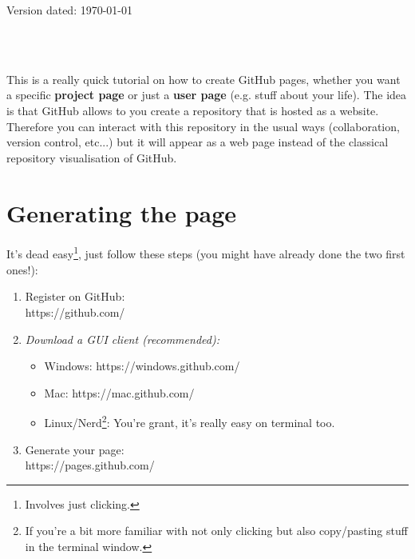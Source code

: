 \documentclass[a4paper,11pt]{article}
\begin{document}
\begin{flushright}
Version dated: \today
\end{flushright}
\begin{center}

\\
\bigskip
\\

\end{center}

This is a really quick tutorial on how to create GitHub pages, whether you want a specific \textbf{project page} or just a \textbf{user page} (e.g. stuff about your life).
The idea is that GitHub allows to you create a repository that is hosted as a website.
Therefore you can interact with this repository in the usual ways (collaboration, version control, etc...) but it will appear as a web page instead of the classical repository visualisation of GitHub.
\section{Generating the page}
It's dead easy\footnote{Involves just clicking.}, just follow these steps (you might have already done the two first ones!):
\begin{enumerate}
    \item{Register on GitHub:}\\
    https://github.com/

    \item{\textit{Download a GUI client (recommended):}}\\
        \begin{itemize}
        \item{Windows: https://windows.github.com/}
        \item{Mac: https://mac.github.com/}
        \item{Linux/Nerd\footnote{If you're a bit more familiar with not only clicking but also copy/pasting stuff in the terminal window.}: You're grant, it's really easy on terminal too.}
        \end{itemize}

    \item{Generate your page:}\\
    https://pages.github.com/
\end{enumerate}
\end{document}

